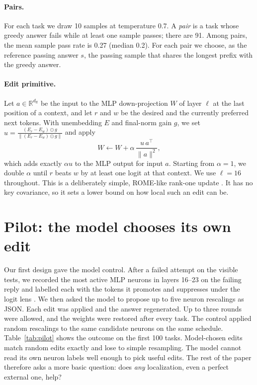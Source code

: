 \documentclass[11pt]{article}
\begin{document}
\paragraph{Pairs.}
For each task we draw 10 samples at temperature 0.7. A \emph{pair} is a task whose greedy answer fails while at least one sample passes; there are 91. Among pairs, the mean sample pass rate is 0.27 (median 0.2). For each pair we choose, as the reference passing answer $s$, the passing sample that shares the longest prefix with the greedy answer.

\paragraph{Edit primitive.}
Let $a\in\mathbb{R}^{d_{\text{ff}}}$ be the input to the MLP down-projection $W$ of layer $\ell$ at the last position of a context, and let $r$ and $w$ be the desired and the currently preferred next tokens. With unembedding $E$ and final-norm gain $g$, we set $u = \frac{(E_r - E_w)\odot g}{\lVert (E_r - E_w)\odot g\rVert}$ and apply
\begin{equation}
W \leftarrow W + \alpha\, \frac{u\,a^\top}{\lVert a\rVert^2},
\end{equation}
which adds exactly $\alpha u$ to the MLP output for input $a$. Starting from $\alpha{=}1$, we double $\alpha$ until $r$ beats $w$ by at least one logit at that context. We use $\ell{=}16$ throughout. This is a deliberately simple, ROME-like rank-one update \citep{meng2022rome}. It has no key covariance, so it sets a lower bound on how local such an edit can be.

\section{Pilot: the model chooses its own edit}
\label{sec:pilot}
Our first design gave the model control. After a failed attempt on the visible tests, we recorded the most active MLP neurons in layers 16--23 on the failing reply and labelled each with the tokens it promotes and suppresses under the logit lens \citep{nostalgebraist2020logitlens,geva2021kv}. We then asked the model to propose up to five neuron rescalings as JSON. Each edit was applied and the answer regenerated. Up to three rounds were allowed, and the weights were restored after every task. The control applied random rescalings to the same candidate neurons on the same schedule. Table~\ref{tab:pilot} shows the outcome on the first 100 tasks. Model-chosen edits match random edits exactly and lose to simple resampling. The model cannot read its own neuron labels well enough to pick useful edits. The rest of the paper therefore asks a more basic question: does \emph{any} localization, even a perfect external one, help?
\end{document}
